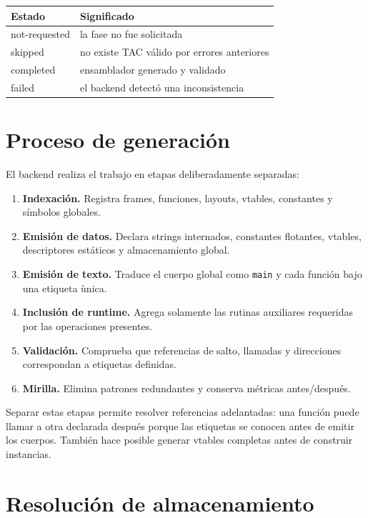 \documentclass[11pt,letterpaper,oneside]{report}
\newcommand{\codigo}[1]{\texttt{#1}}
\begin{document}
\begin{longtable}{p{3cm}p{10cm}}
\toprule
Estado & Significado\\\midrule
\endhead
not-requested & la fase no fue solicitada\\
skipped & no existe TAC v\'alido por errores anteriores\\
completed & ensamblador generado y validado\\
failed & el backend detect\'o una inconsistencia\\
\bottomrule
\end{longtable}

\section{Proceso de generaci\'on}

El backend realiza el trabajo en etapas deliberadamente separadas:

\begin{enumerate}
  \item \textbf{Indexaci\'on.} Registra frames, funciones, layouts, vtables, constantes y s\'imbolos globales.
  \item \textbf{Emisi\'on de datos.} Declara strings internados, constantes flotantes, vtables, descriptores est\'aticos y almacenamiento global.
  \item \textbf{Emisi\'on de texto.} Traduce el cuerpo global como \codigo{main} y cada funci\'on bajo una etiqueta \`unica.
  \item \textbf{Inclusi\'on de runtime.} Agrega solamente las rutinas auxiliares requeridas por las operaciones presentes.
  \item \textbf{Validaci\'on.} Comprueba que referencias de salto, llamadas y direcciones correspondan a etiquetas definidas.
  \item \textbf{Mirilla.} Elimina patrones redundantes y conserva m\'etricas antes/despu\'es.
\end{enumerate}

Separar estas etapas permite resolver referencias adelantadas: una funci\'on puede llamar a otra declarada despu\'es porque las etiquetas se conocen antes de emitir los cuerpos. Tambi\'en hace posible generar vtables completas antes de construir instancias.

\section{Resoluci\'on de almacenamiento}
\end{document}
